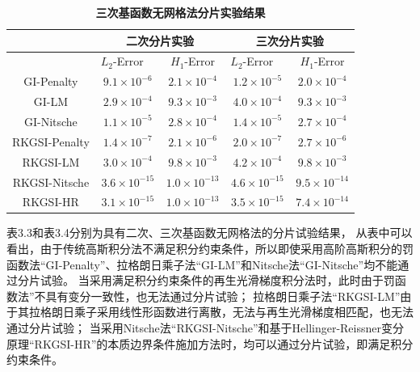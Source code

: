 \begin{table}[H]
\caption{\textbf{三次基函数无网格法分片实验结果}}
\centering
\begin{tabular}{ccccc}
   \toprule
   $\quad$&\multicolumn{2}{c}{二次分片实验}&\multicolumn{2}{c}{三次分片实验}\\
   \midrule
   &$L_2$-Error$\quad$&$H_1$-Error&$L_2$-Error$\quad$&$H_1$-Error\\
   \midrule
   GI-Penalty&$9.1\times10^{-6}$&$2.1\times10^{-4}$&$1.2\times10^{-5}$&$2.0\times10^{-4}$\\
   GI-LM&$2.9\times10^{-4}$&$9.3\times10^{-3}$&$4.0\times10^{-4}$&$9.3\times10^{-3}$\\
   GI-Nitsche&$1.1\times10^{-5}$&$2.8\times10^{-4}$&$1.4\times10^{-5}$&$2.7\times10^{-4}$\\
  RKGSI-Penalty&$1.4\times10^{-7}$&$2.1\times10^{-6}$&$2.0\times10^{-7}$&$2.7\times10^{-6}$\\
  RKGSI-LM&$3.0\times10^{-4}$&$9.8\times10^{-3}$&$4.2\times10^{-4}$&$9.8\times10^{-3}$\\
  RKGSI-Nitsche&$3.6\times10^{-15}$&$1.0\times10^{-13}$&$4.6\times10^{-15}$&$9.5\times10^{-14}$\\
  RKGSI-HR&$3.1\times10^{-15}$&$1.0\times10^{-13}$&$3.5\times10^{-15}$&$7.4\times10^{-14}$\\
   \bottomrule
\end{tabular}
\end{table}
表3.3和表3.4分别为具有二次、三次基函数无网格法的分片试验结果，
从表中可以看出，由于传统高斯积分法不满足积分约束条件，所以即使采用高阶高斯积分的罚函数法“GI-Penalty”、拉格朗日乘子法“GI-LM”和Nitsche法“GI-Nitsche”均不能通过分片试验。
当采用满足积分约束条件的再生光滑梯度积分法时，此时由于罚函数法”不具有变分一致性，也无法通过分片试验；
拉格朗日乘子法“RKGSI-LM”由于其拉格朗日乘子采用线性形函数进行离散，无法与再生光滑梯度相匹配，也无法通过分片试验；
当采用Nitsche法“RKGSI-Nitsche”和基于Hellinger-Reissner变分原理“RKGSI-HR”的本质边界条件施加方法时，均可以通过分片试验，即满足积分约束条件。
